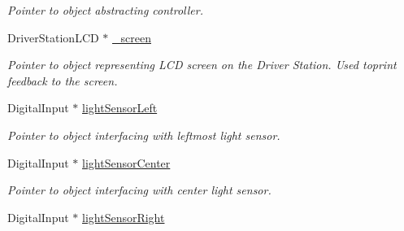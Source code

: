 \begin{DoxyCompactItemize}
\begin{DoxyCompactList}\small\item\em Pointer to object abstracting controller. \item\end{DoxyCompactList}\item 
\hypertarget{class_r_j_f_r_c2011_1_1_autonomous_a45427a812f865b5d200b2642e53d44b0}{
DriverStationLCD $\ast$ \hyperlink{class_r_j_f_r_c2011_1_1_autonomous_a45427a812f865b5d200b2642e53d44b0}{\_\-screen}}
\label{class_r_j_f_r_c2011_1_1_autonomous_a45427a812f865b5d200b2642e53d44b0}

\begin{DoxyCompactList}\small\item\em Pointer to object representing LCD screen on the Driver Station. Used toprint feedback to the screen. \item\end{DoxyCompactList}\item 
\hypertarget{class_r_j_f_r_c2011_1_1_autonomous_ae6c458fcfb8244e4e112c6a836bb5609}{
DigitalInput $\ast$ \hyperlink{class_r_j_f_r_c2011_1_1_autonomous_ae6c458fcfb8244e4e112c6a836bb5609}{lightSensorLeft}}
\label{class_r_j_f_r_c2011_1_1_autonomous_ae6c458fcfb8244e4e112c6a836bb5609}

\begin{DoxyCompactList}\small\item\em Pointer to object interfacing with leftmost light sensor. \item\end{DoxyCompactList}\item 
\hypertarget{class_r_j_f_r_c2011_1_1_autonomous_a4b9f4445f2514da0e59f9129b1b247d3}{
DigitalInput $\ast$ \hyperlink{class_r_j_f_r_c2011_1_1_autonomous_a4b9f4445f2514da0e59f9129b1b247d3}{lightSensorCenter}}
\label{class_r_j_f_r_c2011_1_1_autonomous_a4b9f4445f2514da0e59f9129b1b247d3}

\begin{DoxyCompactList}\small\item\em Pointer to object interfacing with center light sensor. \item\end{DoxyCompactList}\item 
\hypertarget{class_r_j_f_r_c2011_1_1_autonomous_a8ada7ae26d2b78274febe96a415c7fb0}{
DigitalInput $\ast$ \hyperlink{class_r_j_f_r_c2011_1_1_autonomous_a8ada7ae26d2b78274febe96a415c7fb0}{lightSensorRight}}
\label{class_r_j_f_r_c2011_1_1_autonomous_a8ada7ae26d2b78274febe96a415c7fb0}


\end{DoxyCompactItemize}
